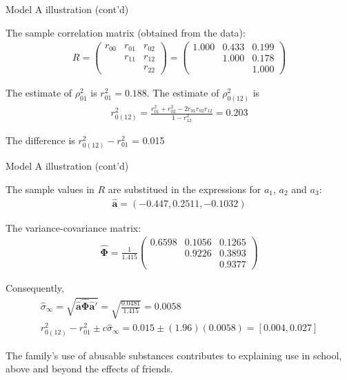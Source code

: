 \documentclass[10pt,pdf]{beamer}
\renewcommand{\vec}[1]{\mathbf{#1}}
\begin{document}
\begin{frame}[t]{Model A illustration (cont’d)}

The sample correlation matrix (obtained from the data):
\begin{gather*}
  R =
  \left( \begin{array}{ccc}
    r_{00} & r_{01} & r_{02} \\
           & r_{11} & r_{12} \\
           &        & r_{22}
  \end{array} \right) =
  \left( \begin{array}{ccc}
    1.000 & 0.433 & 0.199 \\
          & 1.000 & 0.178 \\
          &       & 1.000
  \end{array} \right)
\end{gather*}

The estimate of $\rho_{01}^2$ is $r_{01}^2 = 0.188$. The estimate of $\rho_{0(12)}^2$ is
\begin{gather*}
  r_{0(12)}^2 = \frac{r_{01}^2 + r_{02}^2 - 2 r_{01} r_{02} r_{12}}{1 - r_{12}^2} = 0.203
\end{gather*}

The difference is $r_{0(12)}^2 - r_{01}^2$ = 0.015

\end{frame}


\begin{frame}[t]{Model A illustration (cont’d)}

The sample values in $R$ are substitued in the expressions for $a_1$, $a_2$ and $a_3$:
\begin{gather*}
  \hat{\vec{a}} = (-0.447, 0.2511, -0.1032)
\end{gather*}

The variance-covariance matrix:
\begin{gather*}
  \hat{\boldsymbol{\Phi}} = \frac{1}{1.415}
  \left( \begin{array}{ccc}
    0.6598 & 0.1056 & 0.1265 \\
           & 0.9226 & 0.3893 \\
           &        & 0.9377
  \end{array} \right)
\end{gather*}

Consequently,
\begin{gather*}
  \hat{\sigma}_{\infty} = \sqrt{\hat{\vec{a}} \hat{\boldsymbol{\Phi}} \hat{\vec{a}}'} = \sqrt{\frac{0.0481}{1.415}} = 0.0058 \\
  r_{0(12)}^2 - r_{01}^2 \pm c \hat{\sigma}_{\infty} = 0.015 \pm (1.96)(0.0058) = [0.004, 0.027]
\end{gather*}

The family's use of abusable substances contributes to explaining use in school, above and beyond the effects of friends.

\end{frame}
\end{document}

